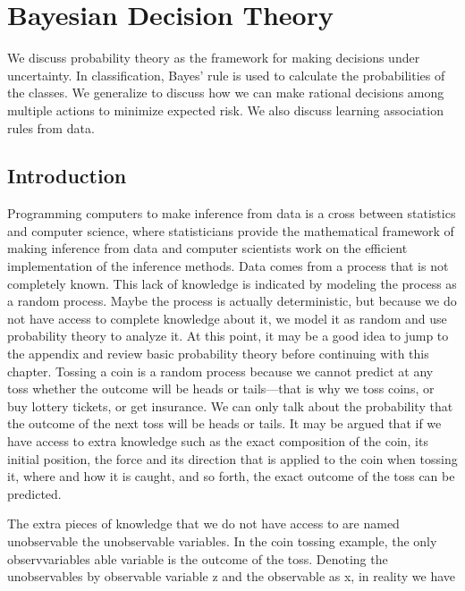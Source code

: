 \chapter{Bayesian Decision Theory}
\label{chap:03-bayesian-decision-theory}

We discuss probability theory as the framework for making decisions under uncertainty. In classification, Bayes’ rule is used to calculate the probabilities of the classes. We generalize to discuss how we can make rational decisions among multiple actions to minimize expected risk. We also discuss learning association rules from data.

\section{Introduction}

Programming computers to make inference from data is a cross between statistics and computer science, where statisticians provide the mathematical framework of making inference from data and computer scientists work on the efficient implementation of the inference methods. Data comes from a process that is not completely known. This lack of knowledge is indicated by modeling the process as a random process. Maybe the process is actually deterministic, but because we do not have access to complete knowledge about it, we model it as random and use probability theory to analyze it. At this point, it may be a good idea to jump to the appendix and review basic probability theory before continuing with this chapter. Tossing a coin is a random process because we cannot predict at any toss whether the outcome will be heads or tails---that is why we toss coins, or buy lottery tickets, or get insurance. We can only talk about the probability that the outcome of the next toss will be heads or tails. It may be argued that if we have access to extra knowledge such as the exact composition of the coin, its initial position, the force and its direction that is applied to the coin when tossing it, where and how it is caught, and so forth, the exact outcome of the toss can be predicted.

The extra pieces of knowledge that we do not have access to are named unobservable the unobservable variables. In the coin tossing example, the only observvariables able variable is the outcome of the toss. Denoting the unobservables by observable variable z and the observable as x, in reality we have

